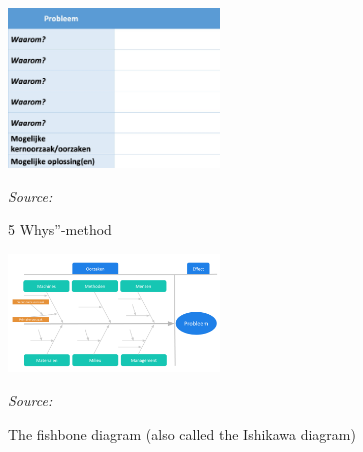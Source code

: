 \begin{figure}[h]
    \centering
    \includegraphics[width=0.5\textwidth]{img/Figuur-5}
    \caption{5 Whys”-method}
    \label{fig:Figuur5}
    \textit{Source: \autocite{Scharwaechter2023}}
\end{figure}

\begin{figure}[h]
    \centering
    \includegraphics[width=0.5\textwidth]{img/Figuur-6}
    \caption{The fishbone diagram (also called the Ishikawa diagram)}
    \label{fig:Figuur6}
    \textit{Source: \autocite{Swaen2023}}
\end{figure}



